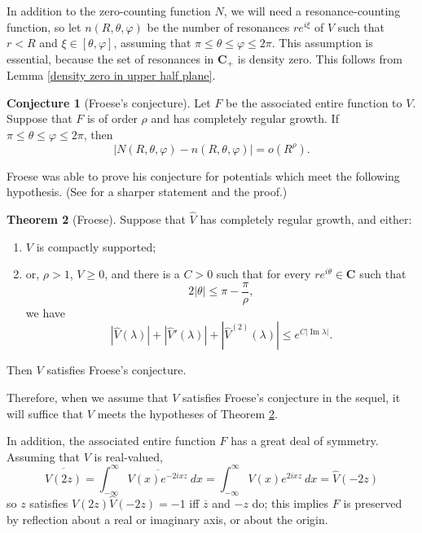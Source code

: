 \documentclass[12pt]{report}
\newcommand{\CC}{\mathbf{C}}
\renewcommand{\Im}{\operatorname{Im}}
\theoremstyle{definition}
\newtheorem{theorem}{Theorem}[chapter]
\newtheorem{conjecture}[theorem]{Conjecture}
\begin{document}
In addition to the zero-counting function $N$, we will need a resonance-counting function, so let $n(R, \theta, \varphi)$ be the number of resonances $re^{i\xi}$ of $V$ such that $r < R$ and $\xi \in [\theta, \varphi]$, assuming that $\pi \leq \theta \leq \varphi \leq 2\pi$.
This assumption is essential, because the set of resonances in $\CC_+$ is density zero. This follows from Lemma \ref{density zero in upper half plane}.
\begin{conjecture}[Froese's conjecture]
Let $F$ be the associated entire function to $V$. Suppose that $F$ is of order $\rho$ and has completely regular growth. If $\pi \leq \theta \leq \varphi \leq 2\pi$, then
$$|N(R, \theta, \varphi) - n(R, \theta, \varphi)| = o(R^\rho).$$
\end{conjecture}

Froese was able to prove his conjecture for potentials which meet the following hypothesis. (See \cite[Theorem 1.3]{froese1997asymptotic} for a sharper statement and the proof.)
\begin{theorem}[Froese]
\label{Froese conjecture theorem}
Suppose that $\hat V$ has completely regular growth, and either:
\begin{enumerate}
\item $V$ is compactly supported;
\item or, $\rho > 1$, $V \geq 0$, and there is a $C > 0$ such that for every $re^{i\theta} \in \CC$ such that
$$2|\theta| \leq \pi - \frac{\pi}{\rho},$$
we have
$$|\hat V(\lambda)| + |\hat V'(\lambda)| + |\hat V^{(2)}(\lambda)| \leq e^{C|\Im \lambda|}.$$
\end{enumerate}
Then $V$ satisfies Froese's conjecture.
\end{theorem}
Therefore, when we assume that $V$ satisfies Froese's conjecture in the sequel, it will suffice that $V$ meets the hypotheses of Theorem \ref{Froese conjecture theorem}.

In addition, the associated entire function $F$ has a great deal of symmetry. Assuming that $V$ is real-valued,
$$\overline{\hat V(2z)} = \int_{-\infty}^\infty \overline{V(x)e^{-2ixz}} ~dx = \int_{-\infty}^\infty V(x) e^{2ixz} ~dx = \hat V(-2z)$$
so $z$ satisfies $\hat V(2z) \hat V(-2z) = -1$ iff $\overline z$ and $-z$ do; this implies $F$ is preserved by reflection about a real or imaginary axis, or about the origin.
\end{document}
